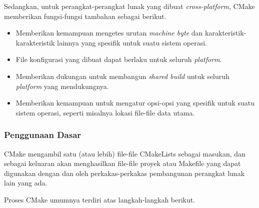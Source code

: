 Sedangkan, untuk perangkat-perangkat lunak yang dibuat \textit{cross-platform}, CMake memberikan fungsi-fungsi tambahan sebagai berikut.

\begin{itemize}
	\item Memberikan kemampuan mengetes urutan \textit{machine byte} dan karakteristik-karakteristik lainnya yang spesifik untuk suatu sistem operasi.
	\item File konfigurasi yang dibuat dapat berlaku untuk seluruh \textit{platform}.
	\item Memberikan dukungan untuk membangun \textit{shared build} untuk seluruh \textit{platform} yang mendukungnya.
	\item Memberikan kemampuan untuk mengatur opsi-opsi yang spesifik untuk suatu sistem operasi, seperti misalnya lokasi file-file data utama.
\end{itemize}

\subsubsection{Penggunaan Dasar}
\label{sec:cmodules-CMake-basicusage}

CMake mengambil satu (atau lebih) file-file CMakeLists sebagai masukan, dan sebagai keluaran akan menghasilkan file-file proyek atau Makefile yang dapat digunakan dengan dan oleh perkakas-perkakas pembangunan perangkat lunak lain yang ada.

Proses CMake umumnya terdiri atas langkah-langkah berikut.

